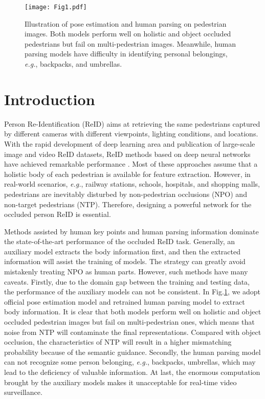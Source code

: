 \documentclass[10pt,twocolumn,letterpaper]{article}
\begin{document}
\begin{figure}[t]
  \centering
   \texttt{[image: Fig1.pdf]}
   \caption{Illustration of pose estimation and human parsing on pedestrian images. Both models perform well on holistic and object occluded pedestrians but fail on multi-pedestrian images. Meanwhile, human parsing models have difficulty in identifying personal belongings, \emph{e.g.}, backpacks, and umbrellas. 
   }
   \label{Fig1}
\end{figure}


\section{Introduction}
Person Re-Identification (ReID) aims at retrieving the same pedestrians captured by different cameras with different viewpoints, lighting conditions, and locations. With the rapid development of deep learning area and publication of large-scale image and video ReID datasets, ReID methods based on deep neural networks have achieved remarkable performance \cite{hermans2017defense,luo2019bag,wang2021robust,wang2019multi}. Most of these approaches assume that a holistic body of each pedestrian is available for feature extraction. However, in real-world scenarios, \emph{e.g.}, railway stations, schools, hospitals, and shopping malls, pedestrians are inevitably disturbed by non-pedestrian occlusions (NPO) and non-target pedestrians (NTP). Therefore, designing a powerful network for the occluded person ReID is essential. 

Methods assisted by human key points \cite{gao2020pose,miao2019pose} and human parsing information \cite{huang2020human} dominate the state-of-the-art performance of the occluded ReID task. Generally, an auxiliary model extracts the body information first, and then the extracted information will assist the training of models. The strategy can greatly avoid mistakenly treating NPO as human parts. However, such methods have many caveats. Firstly, due to the domain gap between the training and testing data, the performance of the auxiliary models can not be consistent. In Fig.\ref{Fig1}, we adopt official pose estimation model \cite{sun2019deep} and retrained human parsing model \cite{zhao2017pyramid} to extract body information. It is clear that both models perform well on holistic and object occluded pedestrian images but fail on multi-pedestrian ones, which means that noise from NTP will contaminate the final representations. Compared with object occlusion, the characteristics of NTP will result in a higher mismatching probability because of the semantic guidance. Secondly, the human parsing model can not recognize some person belonging, \emph{e.g.}, backpacks, umbrellas, which may lead to the deficiency of valuable information. At last, the enormous computation brought by the auxiliary models makes it unacceptable for real-time video surveillance. 
\end{document}
